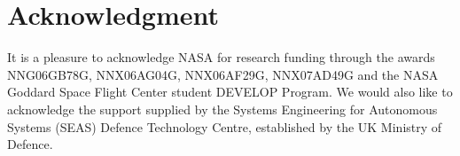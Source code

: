 \documentclass[journal]{IEEEtran}
\begin{document}
\appendices
\section*{Acknowledgment}

It is a pleasure to acknowledge NASA for research funding through the awards NNG06GB78G, NNX06AG04G, NNX06AF29G, NNX07AD49G and the NASA Goddard Space Flight Center student DEVELOP Program. We would also like to acknowledge the support supplied by the Systems Engineering for Autonomous Systems (SEAS) Defence Technology Centre, established by the UK Ministry of Defence.



\end{document}
